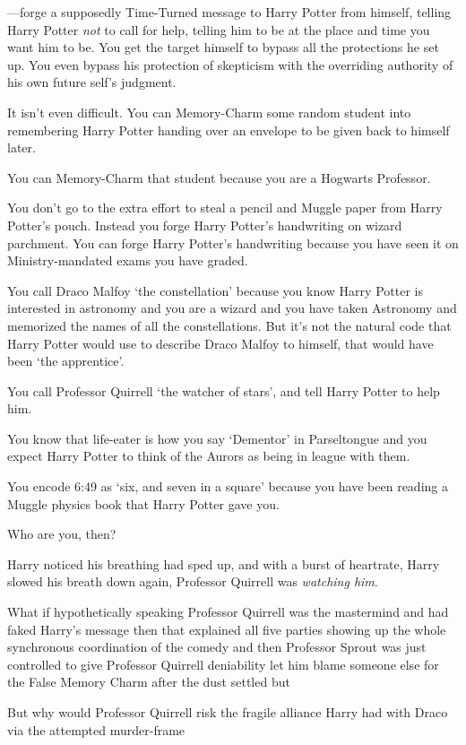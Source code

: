 ---forge a supposedly Time-Turned message to Harry Potter from himself, telling
Harry Potter \emph{not} to call for help, telling him to be at the place and
time you want him to be. You get the target himself to bypass all the
protections he set up. You even bypass his protection of skepticism with the
overriding authority of his own future self's judgment.

It isn't even difficult. You can Memory-Charm some random student into
remembering Harry Potter handing over an envelope to be given back to himself
later.

You can Memory-Charm that student because you are a Hogwarts Professor.

You don't go to the extra effort to steal a pencil and Muggle paper from Harry
Potter's pouch. Instead you forge Harry Potter's handwriting on wizard
parchment. You can forge Harry Potter's handwriting because you have seen it on
Ministry-mandated exams you have graded.

You call Draco Malfoy `the constellation' because you know Harry Potter is
interested in astronomy and you are a wizard and you have taken Astronomy and
memorized the names of all the constellations. But it's not the natural code
that Harry Potter would use to describe Draco Malfoy to himself, that would
have been `the apprentice'.

You call Professor Quirrell `the watcher of stars', and tell Harry Potter to
help him.

You know that life-eater is how you say `Dementor' in Parseltongue and you
expect Harry Potter to think of the Aurors as being in league with them.

You encode 6:49 as `six, and seven in a square' because you have been reading a
Muggle physics book that Harry Potter gave you.

Who are you, then?

Harry noticed his breathing had sped up, and with a burst of heartrate, Harry
slowed his breath down again, Professor Quirrell was \emph{watching him}.

What if hypothetically speaking Professor Quirrell was the mastermind and had
faked Harry's message then that explained all five parties showing up the whole
synchronous coordination of the comedy and then Professor Sprout was just
controlled to give Professor Quirrell deniability let him blame someone else
for the False Memory Charm after the dust settled but

But why would Professor Quirrell risk the fragile alliance Harry had with Draco
via the attempted murder-frame

